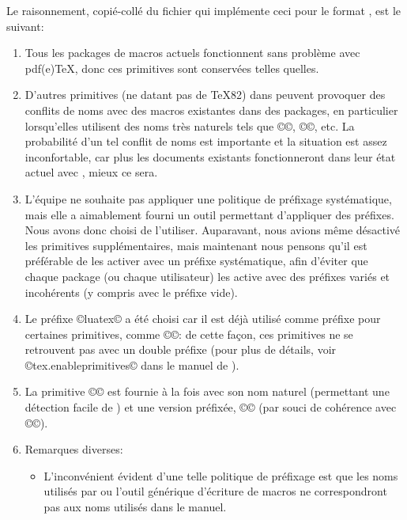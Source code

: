 \documentclass{lltxdoc}
\begin{document}
Le raisonnement, copié-collé du fichier  qui implémente
ceci pour le format , est le suivant:

\begin{myquote}
  \begin{enumerate}
    \item Tous les packages de macros actuels fonctionnent sans problème
      avec pdf(e)TeX, donc ces primitives sont conservées telles quelles.
    \item D'autres primitives (ne datant pas de TeX82) dans \luatex peuvent
      provoquer des conflits de noms avec des macros existantes dans des packages,
      en particulier lorsqu'elles utilisent des noms très \og{}naturels\fg{}
      tels que ©\outputbox©, ©\mathstyle©, etc. La probabilité d'un tel conflit
      de noms est importante et la situation est assez inconfortable, car plus
      les documents \latex existants fonctionneront dans leur état actuel avec
      \luatex, mieux ce sera.
    \item L'équipe \luatex ne souhaite pas appliquer une politique de préfixage
      systématique, mais elle a aimablement fourni un outil permettant d'appliquer
      des préfixes. Nous avons donc choisi de l'utiliser. Auparavant, nous avions
      même désactivé les primitives supplémentaires, mais maintenant nous pensons
      qu'il est préférable de les activer avec un préfixe systématique, afin
      d'éviter que chaque package (ou chaque utilisateur) les active avec des
      préfixes variés et incohérents (y compris avec le préfixe vide).
    \item Le préfixe ©luatex© a été choisi car il est déjà utilisé comme
      préfixe pour certaines primitives, comme ©\luatexversion©: de cette façon,
      ces primitives ne se retrouvent pas avec un double préfixe (pour plus de détails,
      voir ©tex.enableprimitives© dans le manuel de \luatex).
    \item La primitive ©\directlua© est fournie à la fois avec son nom naturel
      (permettant une détection facile de \luatex) et une version préfixée,
      ©\luatexdirectlua© (par souci de cohérence avec ©\luatexlatelua©).
    \item Remarques diverses:
      \begin{itemize}
        \item L'inconvénient évident d'une telle politique de préfixage est
          que les noms utilisés par \latex ou l'outil générique d'écriture de
          macros ne correspondront pas aux noms utilisés dans le manuel.

\end{itemize}
\end{enumerate}
\end{myquote}
\end{document}
